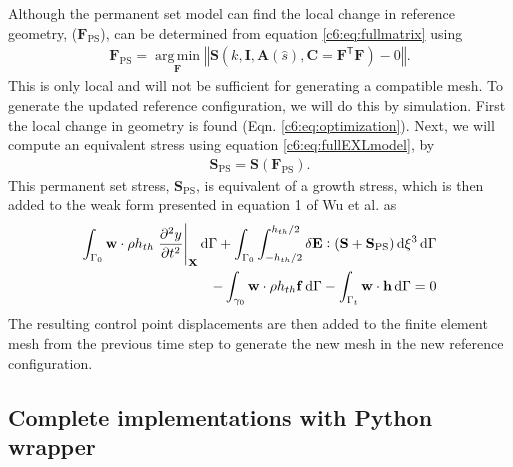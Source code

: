     Although the permanent set model can find the local change in reference geometry, ($\mathbf{F}_\mathrm{PS}$), can be determined from equation \ref{c6:eq:fullmatrix} using
\begin{equation}\label{c6:eq:optimization}
\begin{gathered}
\mathbf{F}_\mathrm{PS} = \operatorname*{arg\,min}_\mathbf{F} \left\Vert \mathbf{S}\left(k , \mathbf{I}, \mathbf{A}(\hat{s}), \mathbf{C}=\mathbf{F}^\mathsf{T}\mathbf{F}\right) - 0 \right\Vert.
\end{gathered}
\end{equation}
    This is only local and will not be sufficient for generating a compatible mesh. To generate the updated reference configuration, we will do this by simulation. First the local change in geometry is found (Eqn. \ref{c6:eq:optimization}). Next, we will compute an equivalent stress using equation \ref{c6:eq:fullEXLmodel}, by
\begin{equation}\label{c6:eq:psstress}
\begin{gathered}
\mathbf{S}_\mathrm{PS} = \mathbf{S}(\mathbf{F}_\mathrm{PS}).
\end{gathered}
\end{equation}
    This permanent set stress, $\mathbf{S}_\mathrm{PS}$, is equivalent of a growth stress, which is then added to the weak form presented in equation 1 of Wu et al. \cite{wu_anisotropic_2018} as 
\begin{equation}\label{c6:eq:weakform}
\begin{aligned}
\int_{\Gamma_0} \mathbf{w}\cdot\rho h_{th} \left.\dpd[2]{y}{t}\right|_\mathbf{X} \dif\Gamma + 
\int_{\Gamma_0} \int_{-h_{th}/2}^{h_{th}/2}\delta\mathbf{E}:(\mathbf{S} + \mathbf{S}_\mathrm{PS}) \dif \xi^3\dif\Gamma&  \\
- \int_{\gamma_0} \mathbf{w}\cdot\rho h_{th}\mathbf{f}\dif\Gamma -\int_{\Gamma_t} \mathbf{w}\cdot\mathbf{h}\dif\Gamma = 0&
\end{aligned}
\end{equation}   
    The resulting control point displacements are then added to the finite element mesh from the previous time step to generate the new mesh in the new reference configuration. 
    

\subsection{Complete implementations with Python wrapper}

